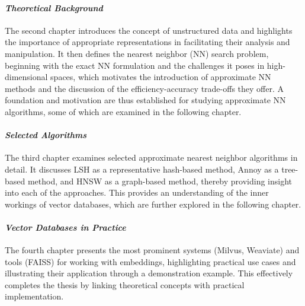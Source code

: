 \paragraph{\textit{Theoretical Background}}

The second chapter introduces the concept of unstructured data and highlights the importance of appropriate representations in facilitating their analysis and manipulation. It then defines the nearest neighbor (NN) search problem, beginning with the exact NN formulation and the challenges it poses in high-dimensional spaces, which motivates the introduction of approximate NN methods and the discussion of the efficiency-accuracy trade-offs they offer.
A foundation and motivation are thus established for studying approximate NN algorithms, some of which are examined in the following chapter.

\paragraph{\textit{Selected Algorithms}}

The third chapter examines selected approximate nearest neighbor algorithms in detail. It discusses LSH as a representative hash-based method, Annoy as a tree-based method, and HNSW as a graph-based method, thereby providing insight into each of the approaches.
This provides an understanding of the inner workings of vector databases, which are further explored in the following chapter.

\paragraph{\textit{Vector Databases in Practice}}

The fourth chapter presents the most prominent systems (Milvus, Weaviate) and tools (FAISS) for working with embeddings, highlighting practical use cases and illustrating their application through a demonstration example.
This effectively completes the thesis by linking theoretical concepts with practical implementation.